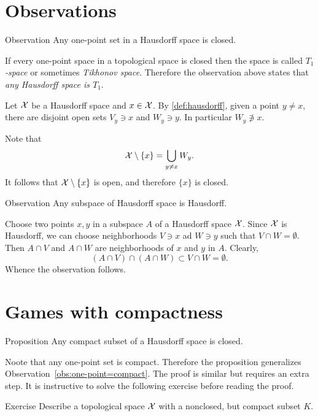 \section{Observations}

\begin{thm}{Observation}\label{obs:one-point=compact}
Any one-point set in a Hausdorff space is closed. 
\end{thm}

If every one-point space in a topological space is closed
then the space is called \emph{$T_1$-space} or sometimes \emph{Tikhonov space}.
Therefore the observation above states that \textit{any Hausdorff space is $T_1$}.

Let $\mathcal{X}$ be a Hausdorff space and $x\in \mathcal{X}$.
By \ref{def:hausdorff}, given a point $y\ne x$,
there are disjoint open sets $V_y\ni x$ and $W_y\ni y$.
In particular $W_y\not\ni x$.

Note that 
\[\mathcal{X}\setminus\{x\}=\bigcup_{y\ne x}W_y.\]
It follows that $\mathcal{X}\setminus\{x\}$ is open, and therefore $\{x\}$ is closed.
\qeds

\begin{thm}{Observation}
Any subspace of Hausdorff space is Hausdorff.
\end{thm}

Choose two points $x,y$ in a subspace $A$ of a Hausdorff space $\mathcal{X}$.
Since $\mathcal{X}$ is Hausdorff, we can choose neighborhoods $V\ni x$ ad $W\ni y$ such that $V\cap W=\emptyset$.
Then $A\cap V$ and $A\cap W$ are neighborhoods of $x$ and $y$ in $A$.
Clearly, 
\[(A\cap V)\cap(A\cap W)\subset V\cap W=\emptyset.\]
Whence the observation follows.
\qeds


\section{Games with compactness}

\begin{thm}{Proposition}\label{prop:hausdorff-compact-closed}
Any compact  subset of a Hausdorff space is closed. 
\end{thm}

Noote that any one-point set is compact.
Therefore the proposition generalizes Observation~\ref{obs:one-point=compact}.
The proof is similar but requires an extra step.
It is instructive to solve the following exercise before reading the proof.

\begin{thm}{Exercise}\label{ex:nonclosed-compact}
Describe a topological space $\mathcal{X}$ with a nonclosed, but compact subset $K$. 
\end{thm}

